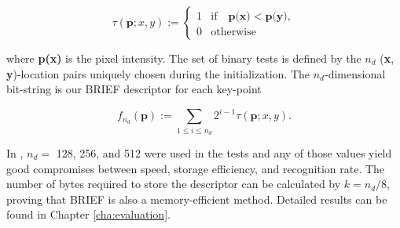 $$\tau(\textbf{p}; x, y) :=
\begin{cases}
  1 &\mbox{if}\quad \textbf{p(x)} < \textbf{p(y)},\\
  0 &\mbox{otherwise}
\end{cases}$$

where \textbf{p(x)} is the pixel intensity. The set of binary tests is defined by the $n_{d}$ (\textbf{x}, \textbf{y})-location pairs uniquely chosen during the initialization. The $n_{d}$-dimensional bit-string is our BRIEF descriptor for each key-point

$$f_{n_{d}}(\textbf{p}) := \sum_{1 \le i \le n_{d}} 2^{i-1} \tau(\textbf{p}; x, y).$$

In \cite{Calonder2010}, $n_{d}=$ 128, 256, and 512 were used in the tests and any of those values yield good compromises between speed, storage efficiency, and recognition rate. The number of bytes required to store the descriptor can be calculated by $k = n_{d}/8$, proving that BRIEF is also a memory-efficient method. Detailed results can be found in Chapter \ref{cha:evaluation}.


